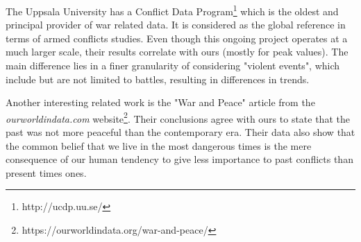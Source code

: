 The Uppsala University has a Conflict Data Program\footnote{http://ucdp.uu.se/} which is the oldest and principal provider of war related data. It is considered as the global reference in terms of armed conflicts studies. Even though this ongoing project operates at a much larger scale, their results correlate with ours (mostly for peak values). The main difference lies in a finer granularity of considering "violent events", which include but are not limited to battles, resulting in differences in trends.

Another interesting related work is the "War and Peace" article from the \textit{ourworldindata.com} website\footnote{https://ourworldindata.org/war-and-peace/}. Their conclusions agree with ours to state that the past was not more peaceful than the contemporary era. Their data also show that the common belief that we live in the most dangerous times is the mere consequence of our human tendency to give less importance to past conflicts than present times ones.